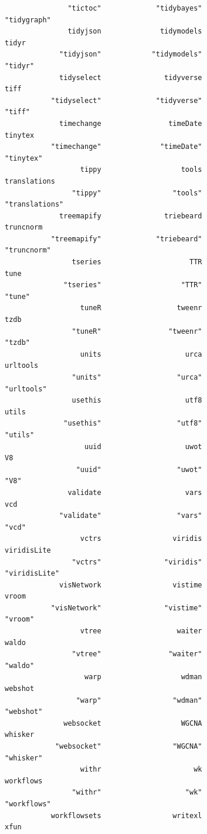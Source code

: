 \documentclass[
  letterpaper,
  DIV=11,
  numbers=noendperiod]{scrreprt}
\begin{document}
\begin{verbatim}
               "tictoc"             "tidybayes"             "tidygraph" 
               tidyjson              tidymodels                   tidyr 
             "tidyjson"            "tidymodels"                 "tidyr" 
             tidyselect               tidyverse                    tiff 
           "tidyselect"             "tidyverse"                  "tiff" 
             timechange                timeDate                 tinytex 
           "timechange"              "timeDate"               "tinytex" 
                  tippy                   tools            translations 
                "tippy"                 "tools"          "translations" 
             treemapify               triebeard               truncnorm 
           "treemapify"             "triebeard"             "truncnorm" 
                tseries                     TTR                    tune 
              "tseries"                   "TTR"                  "tune" 
                  tuneR                  tweenr                    tzdb 
                "tuneR"                "tweenr"                  "tzdb" 
                  units                    urca                urltools 
                "units"                  "urca"              "urltools" 
                usethis                    utf8                   utils 
              "usethis"                  "utf8"                 "utils" 
                   uuid                    uwot                      V8 
                 "uuid"                  "uwot"                    "V8" 
               validate                    vars                     vcd 
             "validate"                  "vars"                   "vcd" 
                  vctrs                 viridis             viridisLite 
                "vctrs"               "viridis"           "viridisLite" 
             visNetwork                 vistime                   vroom 
           "visNetwork"               "vistime"                 "vroom" 
                  vtree                  waiter                   waldo 
                "vtree"                "waiter"                 "waldo" 
                   warp                   wdman                 webshot 
                 "warp"                 "wdman"               "webshot" 
              websocket                   WGCNA                 whisker 
            "websocket"                 "WGCNA"               "whisker" 
                  withr                      wk               workflows 
                "withr"                    "wk"             "workflows" 
           workflowsets                 writexl                    xfun 

\end{verbatim}
\end{document}
